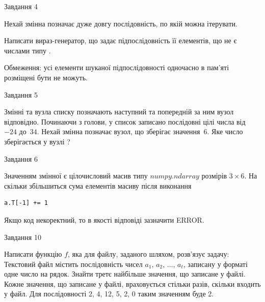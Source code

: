 \documentclass[12pt, ukrainian]{article}
\begin{document}
{\begin{minipage}[t]{8.0cm}
\end{minipage}


               
{\begin{center}Завдання {4}\end{center}}
\vspace{-4mm}
Нехай змінна  позначає дуже довгу послідовність, по якій можна ітерувати.

Написати вираз-генератор, що задає підпослідовність її елементів, що не є числами типу .

Обмеження: усі елементи шуканої підпослідовності одночасно в пам'яті розміщені бути не можуть.\par

\vspace{10mm}
               
{\begin{center}Завдання {5}\end{center}}
\vspace{-4mm}
Змінні  та  вузла списку позначають наступний та попередній за ним вузол відповідно. Починаючи з голови, у список записано послідовні цілі числа від~$-24$ до~$34$. Нехай змінна  позначає вузол, що зберігає значення~$6$.
Яке число зберігається у вузлі  ?\par

               
{\begin{center}Завдання {6}\end{center}}
\vspace{-4mm}
Значенням змінної  є цілочисловий масив типу $numpy.ndarray$ розмірів $3{\times}6$. На скільки збільшиться сума елементів масиву  після виконання
\begin{verbatim}
a.T[-1] += 1
\end{verbatim}


Якщо код некоректний, то в якості відповіді зазначити ERROR.\par

               
{\begin{center}Завдання {10}\end{center}}
\vspace{-4mm}

Написати функцію $f$, яка для файлу, заданого шляхом, розв’язує задачу:\\ Текстовий файл містить послідовність чисел $a_1$, $a_2$, $\ldots$, $a_t$, записану у форматі одне число на рядок. Знайти третє найбільше значення, що записане у файлі. Кожне значення, що записане у файлі, враховується стільки разів, скільки входить у файл. Для послідовності 2, 4, 12, 5, 2, 0 таким значенням буде 2.

}
\end{document}
